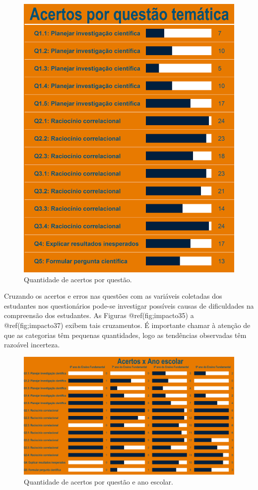 \documentclass[
]{book}
\begin{document}
\begin{figure}

{\centering \includegraphics[width=0.75\linewidth,height=0.75\textheight]{images/Impactos/34} 

}

\caption{Quantidade de acertos por questão.}\label{fig:impacto34}
\end{figure}

Cruzando os acertos e erros nas questões com as variáveis coletadas dos estudantes nos questionários pode-se investigar possíveis causas de dificuldades na compreensão dos estudantes. As Figuras @ref(fig;impacto35) a @ref(fig;impacto37) exibem tais cruzamentos. É importante chamar à atenção de que as categorias têm pequenas quantidades, logo as tendências observadas têm razoável incerteza.

\begin{figure}

{\centering \includegraphics[width=0.75\linewidth,height=0.75\textheight]{images/Impactos/35} 

}

\caption{Quantidade de acertos por questão e ano escolar.}\label{fig:impacto35}
\end{figure}
\end{document}
